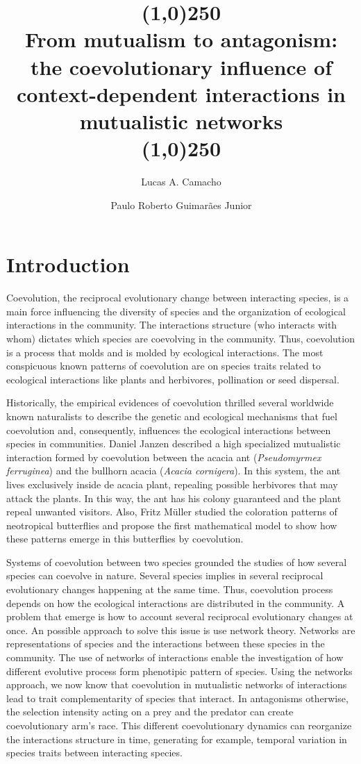 \documentclass[a4paper, 12pt]{article}
\title{\line(1,0){250}\\From mutualism to antagonism: the coevolutionary influence of  context-dependent interactions in mutualistic networks\\\line(1,0){250}}
\author[1]{Lucas A. Camacho}
\author[2]{Paulo Roberto Guimarães Junior}
\date{}
\affil[1,2]{Departamento de Ecologia, Universidade de São Paulo, Rua do Matão, travessa 14, nº 321, Cidade Universitária, São Paulo - SP, CEP: 05508-090, Brasil.}
\begin{document}
\maketitle

\section{Introduction}
\linenumbers
Coevolution, the reciprocal evolutionary change between interacting species, is a main force influencing the diversity of species and the organization of ecological interactions in the community. The interactions structure (who interacts with whom) dictates which species are coevolving in the community. Thus, coevolution is a process that molds and is molded by ecological interactions. The most conspicuous known patterns of coevolution are on species traits related to ecological interactions like plants and herbivores, pollination or seed dispersal.

Historically, the empirical evidences of coevolution thrilled several worldwide known naturalists to describe the genetic and ecological mechanisms that fuel coevolution and, consequently, influences the ecological interactions between species in communities. Daniel Janzen described a high specialized mutualistic interaction formed by coevolution between the acacia ant (\textit{Pseudomyrmex ferruginea}) and the bullhorn acacia (\textit{Acacia cornigera}). In this system, the ant lives exclusively inside de acacia plant, repealing possible herbivores that may attack the plants. In this way, the ant has his colony guaranteed and the plant repeal unwanted visitors. Also, Fritz Müller studied the coloration patterns of neotropical butterflies and propose the first mathematical model to show how these patterns emerge in this butterflies by coevolution.

Systems of coevolution between two species  grounded the studies of how several species can coevolve in nature. Several species implies in several reciprocal evolutionary changes happening at the same time. Thus, coevolution process depends on how the ecological interactions are distributed in the community. A problem that emerge is how to account several reciprocal evolutionary changes at once. An possible approach to solve this issue is use network theory. Networks are representations of species and the interactions between these species in the community. The use of networks of interactions enable the investigation of how different evolutive process form phenotipic pattern of species. Using the networks approach, we now know that coevolution in mutualistic networks of interactions lead to trait complementarity of species that interact. In antagonisms otherwise, the selection intensity acting on a prey and the predator can create coevolutionary arm's race. This different coevolutionary dynamics can reorganize the interactions structure in time, generating for example, temporal variation in species traits between interacting species.
\end{document}
